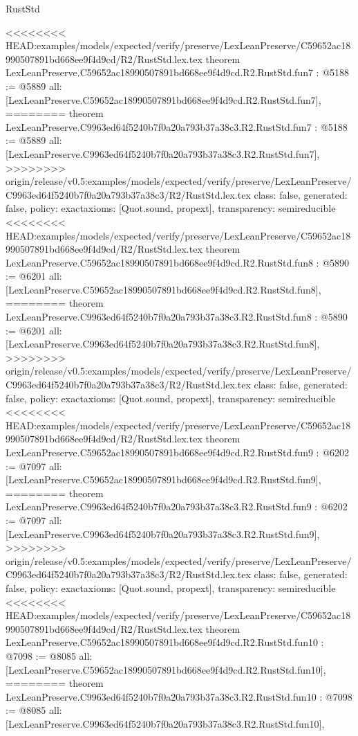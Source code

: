 \begin{lexlean}{RustStd}
\begin{coremodule}
{\begin{coremodule}
{{{{{{{{{{}
<<<<<<<< HEAD:examples/models/expected/verify/preserve/LexLeanPreserve/C59652ac18990507891bd668ee9f4d9cd/R2/RustStd.lex.tex
theorem LexLeanPreserve.C59652ac18990507891bd668ee9f4d9cd.R2.RustStd.fun7 : @5188 := @5889 {
  all: [LexLeanPreserve.C59652ac18990507891bd668ee9f4d9cd.R2.RustStd.fun7],
========
theorem LexLeanPreserve.C9963ed64f5240b7f0a20a793b37a38c3.R2.RustStd.fun7 : @5188 := @5889 {
  all: [LexLeanPreserve.C9963ed64f5240b7f0a20a793b37a38c3.R2.RustStd.fun7],
>>>>>>>> origin/release/v0.5:examples/models/expected/verify/preserve/LexLeanPreserve/C9963ed64f5240b7f0a20a793b37a38c3/R2/RustStd.lex.tex
  class: false,
  generated: false,
  policy: exact{axioms: [Quot.sound, propext]},
  transparency: semireducible
}
<<<<<<<< HEAD:examples/models/expected/verify/preserve/LexLeanPreserve/C59652ac18990507891bd668ee9f4d9cd/R2/RustStd.lex.tex
theorem LexLeanPreserve.C59652ac18990507891bd668ee9f4d9cd.R2.RustStd.fun8 : @5890 := @6201 {
  all: [LexLeanPreserve.C59652ac18990507891bd668ee9f4d9cd.R2.RustStd.fun8],
========
theorem LexLeanPreserve.C9963ed64f5240b7f0a20a793b37a38c3.R2.RustStd.fun8 : @5890 := @6201 {
  all: [LexLeanPreserve.C9963ed64f5240b7f0a20a793b37a38c3.R2.RustStd.fun8],
>>>>>>>> origin/release/v0.5:examples/models/expected/verify/preserve/LexLeanPreserve/C9963ed64f5240b7f0a20a793b37a38c3/R2/RustStd.lex.tex
  class: false,
  generated: false,
  policy: exact{axioms: [Quot.sound, propext]},
  transparency: semireducible
}
<<<<<<<< HEAD:examples/models/expected/verify/preserve/LexLeanPreserve/C59652ac18990507891bd668ee9f4d9cd/R2/RustStd.lex.tex
theorem LexLeanPreserve.C59652ac18990507891bd668ee9f4d9cd.R2.RustStd.fun9 : @6202 := @7097 {
  all: [LexLeanPreserve.C59652ac18990507891bd668ee9f4d9cd.R2.RustStd.fun9],
========
theorem LexLeanPreserve.C9963ed64f5240b7f0a20a793b37a38c3.R2.RustStd.fun9 : @6202 := @7097 {
  all: [LexLeanPreserve.C9963ed64f5240b7f0a20a793b37a38c3.R2.RustStd.fun9],
>>>>>>>> origin/release/v0.5:examples/models/expected/verify/preserve/LexLeanPreserve/C9963ed64f5240b7f0a20a793b37a38c3/R2/RustStd.lex.tex
  class: false,
  generated: false,
  policy: exact{axioms: [Quot.sound, propext]},
  transparency: semireducible
}
<<<<<<<< HEAD:examples/models/expected/verify/preserve/LexLeanPreserve/C59652ac18990507891bd668ee9f4d9cd/R2/RustStd.lex.tex
theorem LexLeanPreserve.C59652ac18990507891bd668ee9f4d9cd.R2.RustStd.fun10 : @7098 := @8085 {
  all: [LexLeanPreserve.C59652ac18990507891bd668ee9f4d9cd.R2.RustStd.fun10],
========
theorem LexLeanPreserve.C9963ed64f5240b7f0a20a793b37a38c3.R2.RustStd.fun10 : @7098 := @8085 {
  all: [LexLeanPreserve.C9963ed64f5240b7f0a20a793b37a38c3.R2.RustStd.fun10],
}}}}}}}}}}}}}}
\end{coremodule}}
\end{coremodule}
\end{lexlean}
